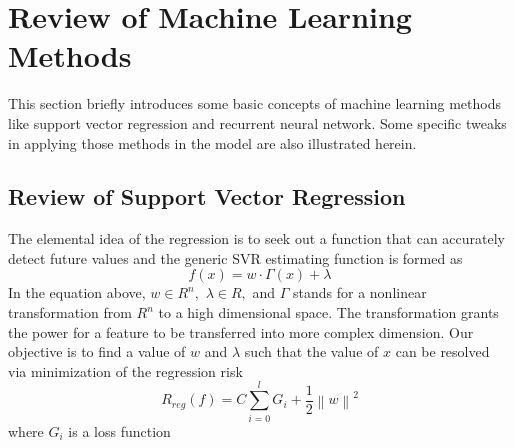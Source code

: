 \section{Review of Machine Learning Methods}
\label{sec:machine_learning_review}
This section briefly introduces some basic concepts of machine learning methods like support vector regression and recurrent neural network. Some specific tweaks in applying those methods in the model are also illustrated herein.

\subsection{Review of Support Vector Regression}
The elemental idea of the regression is to seek out a function that can accurately detect future values and the generic SVR estimating function is formed as
\begin{equation}
f\left( x \right) =  {w \cdot \Gamma \left( x \right)}  + \lambda
\label{eq:1}
\end{equation}
In the equation above, $w \in {R^n},$ $\lambda \in {R},$ and $\Gamma$ stands for a nonlinear transformation from $R^n$ to a high dimensional space. The transformation grants the power for a feature to be transferred into more complex dimension. Our objective is to find a value of $w$ and $\lambda$ such that the value of $x$ can be resolved via minimization of the regression risk
\begin{equation}
{R_{reg}}\left( f \right) = C\sum\limits_{i = 0}^l {{G _i} + \frac{1}{2}{{\left\| w \right\|}^2}}
\label{eq:2}
\end{equation}
where ${G _i}$ is a loss function

